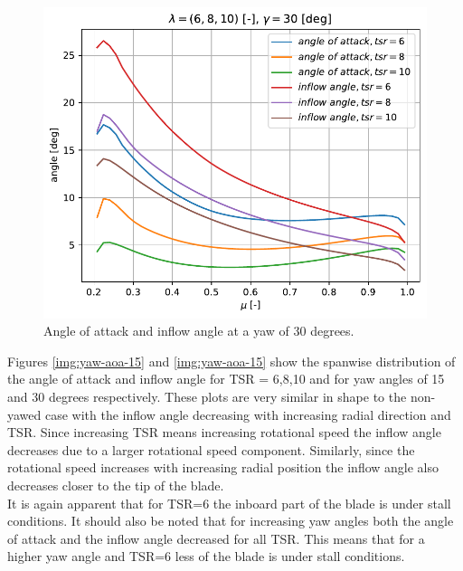 \begin{figure}[htbp]
	\centering
	\includegraphics[height=0.45\textheight]{./img/yaw/alpha_phi-yaw_30.pdf}
	\caption{Angle of attack and inflow angle at a yaw of 30 degrees.}
	\label{img:yaw-aoa-30}
\end{figure}

Figures \ref{img:yaw-aoa-15} and \ref{img:yaw-aoa-15} show the spanwise distribution of the angle of attack and inflow angle for TSR = 6,8,10 and for yaw angles of 15 and 30 degrees respectively. These plots are very similar in shape to the non-yawed case with the inflow angle decreasing with increasing radial direction and TSR. Since increasing TSR means increasing rotational speed the inflow angle decreases due to a larger rotational speed component. Similarly, since the rotational speed increases with increasing radial position the inflow angle also decreases closer to the tip of the blade. \\

It is again apparent that for TSR=6 the inboard part of the blade is under stall conditions. It should also be noted that for increasing yaw angles both the angle of attack and the inflow angle decreased for all TSR. This means that for a higher yaw angle and TSR=6 less of the blade is under stall conditions.


